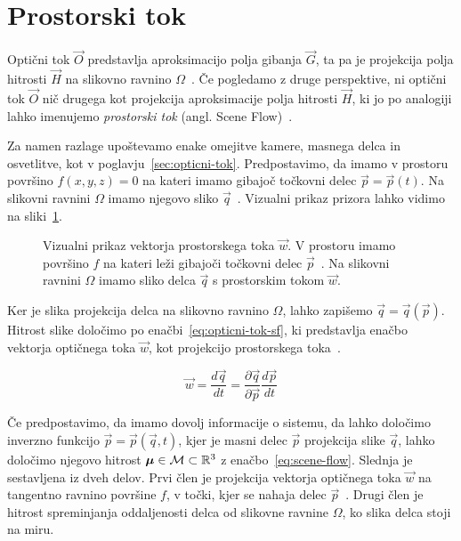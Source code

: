 \section{Prostorski tok}
Optični tok $\vec{O}$ predstavlja aproksimacijo polja gibanja $\vec{G}$, ta pa je projekcija polja hitrosti $\vec{H}$ na slikovno ravnino $\varOmega$~\cite{trucco1998introductory}. Če pogledamo z druge perspektive, ni optični tok $\vec{O}$ nič drugega kot projekcija aproksimacije polja hitrosti $\vec{H}$, ki jo po analogiji lahko imenujemo \emph{prostorski tok} (angl. Scene Flow)~\cite{vedula1999three}.

Za namen razlage upoštevamo enake omejitve kamere, masnega delca in osvetlitve, kot v poglavju~\ref{sec:opticni-tok}. Predpostavimo, da imamo v prostoru površino $f(x,y,z) = 0$ na kateri imamo gibajoč točkovni delec $\vec{p} = \vec{p}(t)$. Na slikovni ravnini $\varOmega$ imamo njegovo sliko $\vec{q}$~\cite{vedula1999three}. Vizualni prikaz prizora lahko vidimo na sliki~\ref{fig:scene-flow}. 




\begin{figure}[htb]
\centering

\caption[Vizualni prikaz vektorja prostorskega toka $\vec{w}$]{Vizualni prikaz vektorja prostorskega toka $\vec{w}$. V prostoru imamo površino $f$ na kateri leži gibajoči točkovni delec $\vec{p}$~\cite{vedula1999three}. Na slikovni ravnini $\varOmega$ imamo sliko delca $\vec{q}$ s prostorskim tokom $\vec{w}$.}
\label{fig:scene-flow}
\end{figure}



Ker je slika projekcija delca na slikovno ravnino $\varOmega$, lahko zapišemo $\vec{q} = \vec{q}(\vec{p})$. Hitrost slike določimo po enačbi~\eqref{eq:opticni-tok-sf}, ki predstavlja enačbo vektorja optičnega toka $\vec{w}$, kot projekcijo prostorskega toka~\cite{vedula1999three}. 


\begin{equation}\label{eq:opticni-tok-sf}
	\vec{w} = \frac{d\vec{q}}{dt} = \frac{\partial \vec{q}}{\partial \vec{p}}\frac{d\vec{p}}{dt}
\end{equation}

Če predpostavimo, da imamo dovolj informacije o sistemu, da lahko določimo inverzno funkcijo $\vec{p} = \vec{p}(\vec{q},t)$, kjer je masni delec $\vec{p}$ projekcija slike $\vec{q}$, lahko določimo njegovo hitrost ${\boldsymbol{\mu}} \in \mathcal{M} \subset \mathbb{R}^3$ z enačbo~\eqref{eq:scene-flow}. Slednja je sestavljena iz dveh delov. Prvi člen je projekcija vektorja optičnega toka $\vec{w}$ na tangentno ravnino površine $f$, v točki, kjer se nahaja delec $\vec{p}$~\cite{vedula1999three}. Drugi člen je hitrost spreminjanja oddaljenosti delca od slikovne ravnine $\varOmega$, ko slika delca stoji na miru. 

